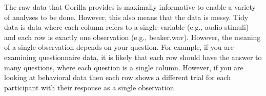 The raw data that Gorilla provides is maximally informative to enable a variety of analyses to be done. However, this also means that the data is messy. Tidy data is data where each column refers to a single variable (e.g., audio stimuli) and each row is exactly one observation (e.g., beaker.wav). However, the meaning of a single observation depends on your question. For example, if you are examining questionnaire data, it is likely that each row should have the answer to many questions, where each question is a single column. However, if you are looking at behavioral data then each row shows a different trial for each participant with their response as a single observation.
\newline
\newline
